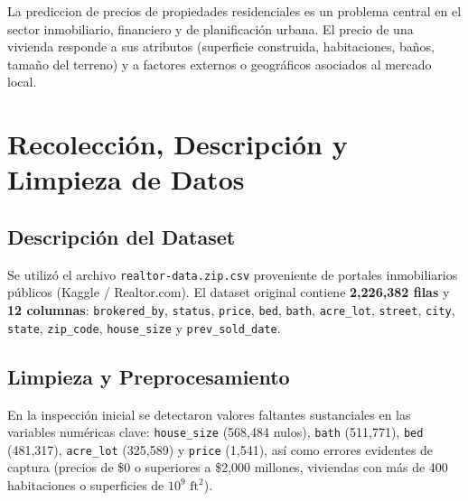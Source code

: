 \documentclass[11pt,a4paper]{article}
\begin{document}
La prediccion de precios de propiedades residenciales es un problema central en el sector inmobiliario, financiero y de planificación urbana. El precio de una vivienda responde a sus atributos (superficie construida, habitaciones, baños, tamaño del terreno) y a factores externos o geográficos asociados al mercado local.

\section{Recolección, Descripción y Limpieza de Datos}

\subsection{Descripción del Dataset}
Se utilizó el archivo \texttt{realtor-data.zip.csv} proveniente de portales inmobiliarios públicos (Kaggle / Realtor.com). El dataset original contiene \textbf{2{,}226{,}382 filas} y \textbf{12 columnas}: \texttt{brokered\_by}, \texttt{status}, \texttt{price}, \texttt{bed}, \texttt{bath}, \texttt{acre\_lot}, \texttt{street}, \texttt{city}, \texttt{state}, \texttt{zip\_code}, \texttt{house\_size} y \texttt{prev\_sold\_date}.


\subsection{Limpieza y Preprocesamiento}
En la inspección inicial se detectaron valores faltantes sustanciales en las variables numéricas clave: \texttt{house\_size} (568{,}484 nulos), \texttt{bath} (511{,}771), \texttt{bed} (481{,}317), \texttt{acre\_lot} (325{,}589) y \texttt{price} (1{,}541), así como errores evidentes de captura (precios de \$0 o superiores a \$2{,}000 millones, viviendas con más de 400 habitaciones o superficies de $10^9\text{ ft}^2$).
\end{document}
